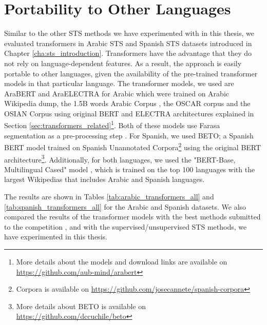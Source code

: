 \section{Portability to Other Languages}
\label{sec:transformer_multilingual}
Similar to the other STS methods we have experimented with in this thesis, we evaluated transformers in Arabic STS and Spanish STS datasets introduced in Chapter \ref{cha:sts_introduction}. Transformers have the advantage that they do not rely on language-dependent features.  As a result, the approach is easily portable to other languages, given the availability of the pre-trained transformer models in that particular language. The transformer models, we used are AraBERT and AraELECTRA for Arabic which were trained on Arabic Wikipedia dump, the 1.5B words Arabic Corpus \autocite{elkhair201615}, the OSCAR corpus \autocite{ortiz-suarez-etal-2020-monolingual} and the OSIAN Corpus \autocite{zeroual-etal-2019-osian} using original BERT and ELECTRA architectures explained in Section \ref{sec:transformers_related}\footnote{More details about the models and download links are available on \url{https://github.com/aub-mind/arabert}}. Both of these models use Farasa segmentation as a pre-processing step \autocite{abdelali-etal-2016-farasa}. For Spanish, we used BETO; a Spanish BERT model \autocite{CaneteCFP2020} trained on Spanish Unannotated Corpora\footnote{Corpora is available on \url{https://github.com/josecannete/spanish-corpora}} using the original BERT architecture\footnote{More details about BETO is available on \url{https://github.com/dccuchile/beto}}. Additionally, for both languages, we used the "BERT-Base, Multilingual Cased" model \autocite{devlin-etal-2019-bert}, which is trained on the top 100 languages with the largest Wikipedias that includes Arabic and Spanish languages.

The results are shown in Tables \ref{tab:arabic_transformers_all} and \ref{tab:spanish_transformers_all} for the Arabic and Spanish datasets. We also compared the results of the transformer models with the best methods submitted to the competition \autocite{cer-etal-2017-semeval}, and with the supervised/unsupervised STS methods, we have experimented in this thesis. 


